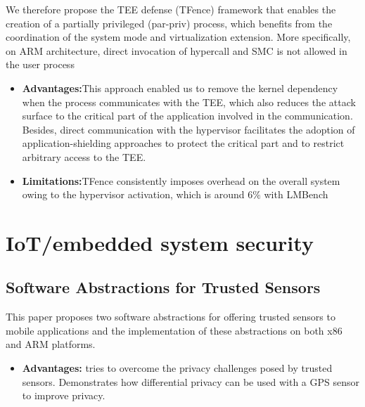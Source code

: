 \documentclass[conference]{IEEEtran}
\begin{document}
We therefore propose the TEE defense (TFence) framework that enables the creation of a partially privileged (par-priv) process, which benefits from the coordination of the system mode and virtualization extension. More specifically, on ARM architecture, direct invocation of hypercall and SMC is not allowed in the user process
\begin{itemize}
    \item \textbf{Advantages:}This approach enabled us to remove the kernel dependency when the process communicates with the TEE, which also reduces the attack surface to the critical part of the application involved in the communication. Besides, direct communication with the hypervisor facilitates the adoption of application-shielding approaches to protect the critical part and to restrict arbitrary access to the TEE.
    \item \textbf{Limitations:}TFence consistently imposes overhead on the overall system owing to the hypervisor activation, which is around $6\%$ with LMBench
\end{itemize}


\section{IoT/embedded system security}


\subsection{Software Abstractions for Trusted Sensors}
This paper proposes two software abstractions for offering trusted sensors to mobile applications and the implementation of these abstractions on both x86 and ARM platforms.
\begin{itemize}
    \item \textbf{Advantages:} tries to overcome the privacy challenges posed by trusted sensors. Demonstrates how differential privacy can be used with a GPS sensor to improve privacy.
\end{itemize}
\end{document}
